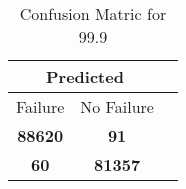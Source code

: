 \begin{table}[] 
\label{Table: Prediction Accuracy-DMD99.9OnlySunEKF-combinationReflection-Reflection} 
\caption{Confusion Matric for 99.9} 
\centering 
\begin{tabular} 
 {@{}ccc@{}} 
\toprule 
\multicolumn{2}{c}{\textbf{Predicted}}
 \\ \midrule 
\multicolumn{1}{|c|}{Failure} & 
\multicolumn{1}{c|}{No Failure}
 \\ \midrule 
\multicolumn{1}{|c|}{\color{green}\textbf{88620}} & 
\multicolumn{1}{c|}{\color{red}\textbf{91}}
 \\ \midrule 
\multicolumn{1}{|c|}{\color{red}\textbf{60}} & 
\multicolumn{1}{c|}{\color{green}\textbf{81357}}
 \\ \bottomrule 
\end{tabular} 
\end{table} 
